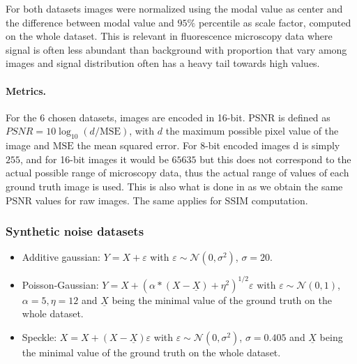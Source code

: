 \documentclass{article}
\begin{document}
For both datasets images were normalized using the modal value as center and the difference between modal value and $95\%$ percentile as scale factor, computed on the whole dataset.
This is relevant in fluorescence microscopy data where signal is often less abundant than background with proportion that vary among images and signal distribution often has a heavy tail towards high values.

\paragraph{Metrics.}
For the 6 chosen datasets, images are encoded in 16-bit.
PSNR is defined as $PSNR = 10 \log_{10}(d/\mathrm{MSE})$, with $d$ the maximum possible pixel value of the image and $\mathrm{MSE}$ the mean squared error.
For 8-bit encoded images d is simply $255$, and for 16-bit images it would be $65635$ but this does not correspond to the actual possible range of microscopy data, thus the actual range of values of each ground truth image is used. This is also what is done in \cite{goncharova2020} as we obtain the same PSNR values for raw images.
The same applies for SSIM computation.

\subsubsection{Synthetic noise datasets}
\label{si:synthetic}
\begin{itemize}
  \item Additive gaussian: $Y = X + \varepsilon$ with $\varepsilon \sim \mathcal{N}(0, \sigma^2)$, $\sigma=20$.
  \item Poisson-Gaussian: $Y = X + (\alpha * (X-\underline{X}) + \eta^2 )^{1/2}\varepsilon$  with $\varepsilon \sim \mathcal{N}(0, 1)$, $\alpha=5, \eta=12$ and $\underline{X}$ being the minimal value of the ground truth on the whole dataset.
  \item Speckle: $X = X + (X-\underline{X})\varepsilon$  with $\varepsilon \sim \mathcal{N}(0, \sigma^2)$, $\sigma=0.405$ and $\underline{X}$ being the minimal value of the ground truth on the whole dataset.
\end{itemize}
\end{document}
